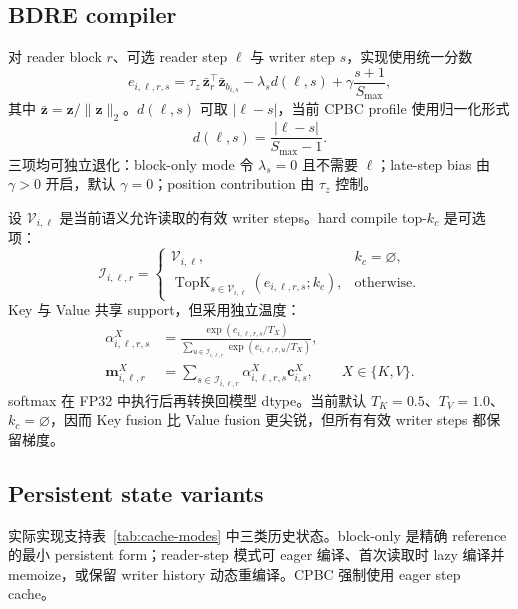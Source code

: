\documentclass[UTF8,twocolumn,10pt,a4paper]{ctexart}
\newcommand{\TopK}{\operatorname{TopK}}
\newcommand{\CPBC}{\textsf{CPBC}}
\begin{document}
\subsection{BDRE compiler}
对 reader block $r$、可选 reader step $\ell$ 与 writer step $s$，实现使用统一分数
\begin{equation}
  e_{i,\ell,r,s}
  =\tau_z\,\bar{\bm z}_r^\top\bar{\bm z}_{b_{i,s}}
  -\lambda_s d(\ell,s)
  +\gamma\frac{s+1}{S_{\max}},
  \label{eq:bdre-score}
\end{equation}
其中 $\bar{\bm z}=\bm z/\lVert\bm z\rVert_2$。$d(\ell,s)$ 可取 $|\ell-s|$，当前 \CPBC{} profile 使用归一化形式
\begin{equation}
  d(\ell,s)=\frac{|\ell-s|}{S_{\max}-1}.
\end{equation}
三项均可独立退化：block-only mode 令 $\lambda_s=0$ 且不需要 $\ell$；late-step bias 由 $\gamma>0$ 开启，默认 $\gamma=0$；position contribution 由 $\tau_z$ 控制。

设 $\mathcal V_{i,\ell}$ 是当前语义允许读取的有效 writer steps。hard compile top-$k_c$ 是可选项：
\begin{equation}
  \mathcal I_{i,\ell,r}=
  \begin{cases}
    \mathcal V_{i,\ell}, & k_c=\varnothing,\\
    \TopK_{s\in\mathcal V_{i,\ell}}(e_{i,\ell,r,s};k_c),
      & \text{otherwise}.
  \end{cases}
\end{equation}
Key 与 Value 共享 support，但采用独立温度：
\begin{align}
  \alpha^X_{i,\ell,r,s}
  &=\frac{\exp(e_{i,\ell,r,s}/T_X)}
  {\sum_{u\in\mathcal I_{i,\ell,r}}
    \exp(e_{i,\ell,r,u}/T_X)},\\
  \bm m^X_{i,\ell,r}
  &=\sum_{s\in\mathcal I_{i,\ell,r}}
    \alpha^X_{i,\ell,r,s}\bm c^X_{i,s},
  \qquad X\in\{K,V\}.
  \label{eq:compiled-cache}
\end{align}
softmax 在 FP32 中执行后再转换回模型 dtype。当前默认 $T_K=0.5$、$T_V=1.0$、$k_c=\varnothing$，因而 Key fusion 比 Value fusion 更尖锐，但所有有效 writer steps 都保留梯度。

\subsection{Persistent state variants}
实际实现支持表~\ref{tab:cache-modes} 中三类历史状态。block-only 是精确 reference 的最小 persistent form；reader-step 模式可 eager 编译、首次读取时 lazy 编译并 memoize，或保留 writer history 动态重编译。\CPBC{} 强制使用 eager step cache。
\end{document}
